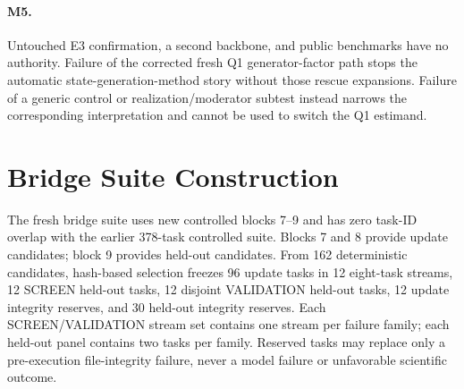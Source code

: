 \paragraph{M5.}
Untouched E3 confirmation, a second backbone, and public benchmarks have no authority. Failure of the corrected fresh Q1 generator-factor path stops the automatic state-generation-method story without those rescue expansions. Failure of a generic control or realization/moderator subtest instead narrows the corresponding interpretation and cannot be used to switch the Q1 estimand.

\section{Bridge Suite Construction}
\label{app:suite}

The fresh bridge suite uses new controlled blocks 7--9 and has zero task-ID overlap with the earlier 378-task controlled suite. Blocks 7 and 8 provide update candidates; block 9 provides held-out candidates. From 162 deterministic candidates, hash-based selection freezes 96 update tasks in 12 eight-task streams, 12 SCREEN held-out tasks, 12 disjoint VALIDATION held-out tasks, 12 update integrity reserves, and 30 held-out integrity reserves. Each SCREEN/VALIDATION stream set contains one stream per failure family; each held-out panel contains two tasks per family. Reserved tasks may replace only a pre-execution file-integrity failure, never a model failure or unfavorable scientific outcome.
